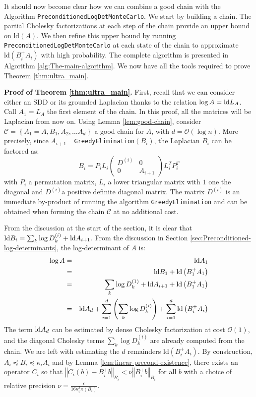 It should now become clear how we can combine a good chain with the
Algorithm \texttt{PreconditionedLogDetMonteCarlo}. We start by building
a chain. The partial Cholesky factorizations at each step of the chain
provide an upper bound on $\mbox{ld}\left(A\right)$. We then refine
this upper bound by running \texttt{Preconditioned\-LogDetMonteCarlo}
at each state of the chain to approximate $\mbox{ld}\left(B_{i}^{+}A_{i}\right)$
with high probability. The complete algorithm is presented in Algorithm
\ref{alg:The-main-algorithm}. We now have all the tools required
to prove Theorem \ref{thm:ultra_main}.

\textbf{Proof of Theorem \ref{thm:ultra_main}.} First, recall that
we can consider either an SDD or its grounded Laplacian thanks to
the relation $\log A=\text{\textnormal{ld}} L_{A}$. Call $A_{1}=L_{A}$ the first element
of the chain. In this proof, all the matrices will be Laplacian from
now on. Using Lemma \ref{lem:good-chain}, consider $\mathcal{C}=\left\{ A_{1}=A,B_{1},A_{2},\dots A_{d}\right\} $
a good chain for $A$, with $d=\mathcal{O}\left(\log n\right)$. More
precisely, since $A_{i+1}$= \texttt{Greedy\-Elimination}$\left(B_{i}\right)$,
the Laplacian $B_{i}$ can be factored as: 
\[
B_{i}=P_{i}L_{i}\left(\begin{array}{cc}
D^{\left(i\right)} & 0\\
0 & A_{i+1}
\end{array}\right)L_{i}^{T}P_{i}^{T}
\]
with $P_{i}$ a permutation matrix, $L_{i}$ a lower triangular matrix
with $1$ one the diagonal and $D^{\left(i\right)}$a positive definite
diagonal matrix. The matrix $D^{\left(i\right)}$ is an immediate
by-product of running the algorithm \texttt{GreedyElimination} and
can be obtained when forming the chain $\mathcal{C}$ at no additional
cost.

From the discussion at the start of the section, it is clear that
$\text{\textnormal{ld}} B_{i}=\sum_{k}\log D_{k}^{\left(i\right)}+\text{\textnormal{ld}} A_{i+1}$. From
the discussion in Section \ref{sec:Preconditioned-log-determinants},
the log-determinant of $A$ is: 
\begin{eqnarray*}
\log A & = & \text{\textnormal{ld}} A_{1}\\
 & = & \text{\textnormal{ld}} B_{1}+\text{\textnormal{ld}}\left(B_{1}^{+}A_{1}\right)\\
 & = & \sum_{k}\log D_{k}^{\left(1\right)}+\text{\textnormal{ld}} A_{i+1}+\text{\textnormal{ld}}\left(B_{1}^{+}A_{1}\right)\\
 & = & \text{\textnormal{ld}} A_{d}+\sum_{i=1}^{d}\left(\sum_{k}\log D_{k}^{\left(i\right)}\right)+\sum_{i=1}^{d}\text{\textnormal{ld}}\left(B_{i}^{+}A_{i}\right)
\end{eqnarray*}
The term $\text{\textnormal{ld}} A_{d}$ can be estimated by dense Cholesky factorization
at cost $\mathcal{O}\left(1\right)$, and the diagonal Cholesky terms
$\sum_{k}\log D_{k}^{\left(i\right)}$ are already computed from the
chain. We are left with estimating the $d$ remainders $\text{ld}\left(B_{i}^{+}A_{i}\right)$.
By construction, $A_{i}\preceq B_{i}\preceq\kappa_{i}A_{i}$ and by
Lemma \ref{lem:linear-precond-existence}, there exists an operator
$C_{i}$ so that $\left\Vert C_{i}\left(b\right)-B_{i}^{+}b\right\Vert _{B_{i}}<\nu\left\Vert B_{i}^{+}b\right\Vert _{B_{i}}$
for all $b$ with a choice of relative precision $\nu=\frac{\epsilon}{16\kappa_{i}^{3}\kappa\left(B_{i}\right)}$.

